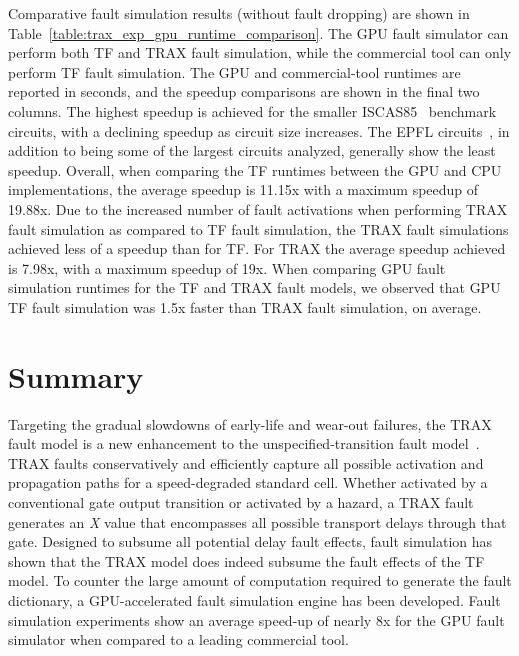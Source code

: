 Comparative fault simulation results (without fault dropping) are shown in Table~\ref{table:trax_exp_gpu_runtime_comparison}.
%
The GPU fault simulator can perform both TF and TRAX fault simulation, while the commercial tool can only perform TF fault simulation.
%
The GPU and commercial-tool runtimes are reported in seconds, and the speedup comparisons are shown in the final two columns.
%
The highest speedup is achieved for the smaller ISCAS85~\cite{brglez85} benchmark circuits, with a declining speedup as circuit size increases.
%
The EPFL circuits~\cite{epfl}, in addition to being some of the largest circuits analyzed, generally show the least speedup.
%
Overall, when comparing the TF runtimes between the GPU and CPU implementations, the average speedup is 11.15x with a maximum speedup of 19.88x.
%
Due to the increased number of fault activations when performing TRAX fault simulation as compared to TF fault simulation, the TRAX fault simulations achieved less of a speedup than for TF.
%
For TRAX the average speedup achieved is 7.98x, with a maximum speedup of 19x.
%
When comparing GPU fault simulation runtimes for the TF and TRAX fault models, we observed that GPU TF fault simulation was 1.5x faster than TRAX fault simulation, on average.
%



\section{Summary}
\label{sec:trax_summary}

Targeting the gradual slowdowns of early-life and wear-out failures, the TRAX fault model is a new enhancement to the unspecified-transition fault model~\cite{pomeranz08}.
%
TRAX faults conservatively and efficiently capture all possible activation and propagation paths for a speed-degraded standard cell.
%
Whether activated by a conventional gate output transition or activated by a hazard, a TRAX fault generates an \textit{X} value that encompasses all possible transport delays through that gate.
%
Designed to subsume all potential delay fault effects, fault simulation has shown that the TRAX model does indeed subsume the fault effects of the TF model.
%
To counter the large amount of computation required to generate the fault dictionary, a GPU-accelerated fault simulation engine has been developed.
%
Fault simulation experiments show an average speed-up of nearly 8x for the GPU fault simulator when compared to a leading commercial tool.

